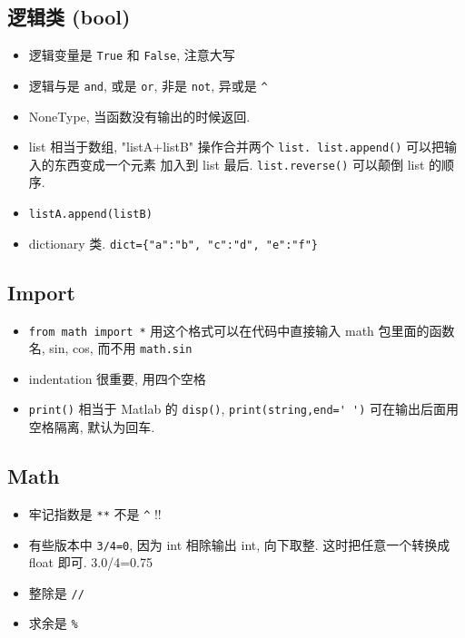 \subsection{逻辑类 (bool)}
\begin{itemize}
\item 逻辑变量是 \verb|True| 和 \verb|False|, 注意大写
\item 逻辑与是 \verb|and|, 或是 \verb|or|, 非是 \verb|not|, 异或是 \verb|^|
\item NoneType, 当函数没有输出的时候返回.
\item list 相当于数组, "listA+listB" 操作合并两个 \verb|list. list.append()| 可以把输入的东西变成一个元素
    加入到 list 最后.  \verb|list.reverse()| 可以颠倒 list 的顺序.
\item \verb|listA.append(listB)|
\item dictionary 类.  \verb|dict={"a":"b", "c":"d", "e":"f"}|
\end{itemize}

\subsection{Import}
\begin{itemize}
\item \verb`from math import *` 用这个格式可以在代码中直接输入 math 包里面的函数名, sin, cos, 而不用 \verb`math.sin`
\item indentation 很重要, 用四个空格
\item \verb`print()` 相当于 Matlab 的 \verb|disp()|, \verb|print(string,end=' ')| 可在输出后面用空格隔离, 默认为回车. 
\end{itemize}

\subsection{Math}
\begin{itemize}
\item 牢记指数是 \verb`**` 不是 \verb`^` !!
\item 有些版本中 \verb`3/4=0`, 因为 int 相除输出 int, 向下取整. 这时把任意一个转换成float 即可. 3.0/4=0.75
\item 整除是 \verb`//`
\item 求余是 \verb`%`
\end{itemize}

